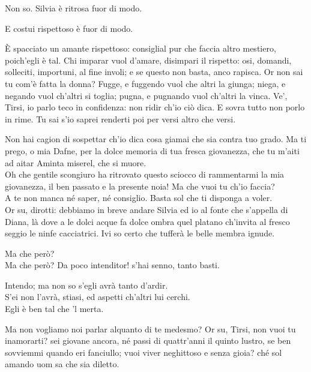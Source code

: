\documentclass{book}
\begin{document}
	\2 Non so. Silvia \`e ritrosa fuor di modo.

	\5 E costui rispettoso \`e fuor di modo.

	\2 \`E spacciato un amante rispettoso:
	consiglial pur che faccia altro mestiero,
	poich'egli \`e tal. Chi imparar vuol d'amare,
	disimpari il rispetto: osi, domandi,
	solleciti, importuni, al fine involi;
	e se questo non basta, anco rapisca.
	Or non sai tu com'\`e fatta la donna?
	Fugge, e fuggendo vuol che altri la giunga;
	niega, e negando vuol ch'altri si toglia;
	pugna, e pugnando vuol ch'altri la vinca.
	Ve', Tirsi, io parlo teco in confidenza:
	non ridir ch'io ci\`o dica. E sovra tutto
	non porlo in rime. Tu sai s'io saprei
	renderti poi per versi altro che versi.

	\5 Non hai cagion di sospettar ch'io dica
	cosa giamai che sia contra tuo grado.
	Ma ti prego, o mia Dafne, per la dolce
	memoria di tua fresca giovanezza,
	che tu m'aiti ad aitar Aminta
	miserel, che si muore. \\

   \2 Oh che gentile
	scongiuro ha ritrovato questo sciocco
	di rammentarmi la mia giovanezza,
	il ben passato e la presente noia!
	Ma che vuoi tu ch'io faccia? \\

   \5 A te non manca
	n\'e saper, n\'e consiglio. Basta sol che
	ti disponga a voler. \\

   \2 Or su, dirotti:
	debbiamo in breve andare Silvia ed io
	al fonte che s'appella di Diana,
	l\`a dove a le dolci acque fa dolce ombra
	quel platano ch'invita al fresco seggio
	le ninfe cacciatrici. Ivi so certo
	che tuffer\`a le belle membra ignude.

	\5 Ma che per\`o? \\

   \2 Ma che per\`o? Da poco
	intenditor! s'hai senno, tanto basti.

	\5 Intendo; ma non so s'egli avr\`a tanto
	d'ardir. \\

   \2 S'ei non l'avr\`a, stiasi, ed aspetti
	ch'altri lui cerchi. \\

   \5 Egli \`e ben tal che 'l merta.

	\2 Ma non vogliamo noi parlar alquanto
	di te medesmo? Or su, Tirsi, non vuoi
	tu inamorarti? sei giovane ancora,
	n\'e passi di quattr'anni il quinto lustro,
	se ben sovviemmi quando eri fanciullo;
	vuoi viver neghittoso e senza gioia?
	ch\'e sol amando uom sa che sia diletto.
\end{document}
